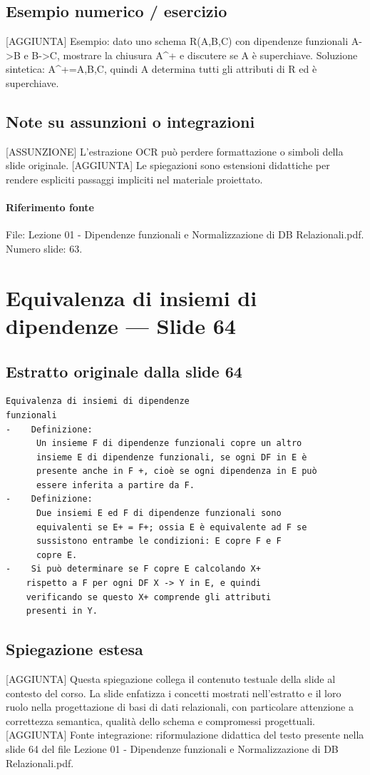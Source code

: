 \documentclass[11pt]{article}
\begin{document}
\subsection*{Esempio numerico / esercizio}
[AGGIUNTA] Esempio: dato uno schema R(A,B,C) con dipendenze funzionali A->B e B->C, mostrare la chiusura A^+ e discutere se A è superchiave. Soluzione sintetica: A^+={A,B,C}, quindi A determina tutti gli attributi di R ed è superchiave.
\subsection*{Note su assunzioni o integrazioni}
[ASSUNZIONE] L'estrazione OCR può perdere formattazione o simboli della slide originale.
[AGGIUNTA] Le spiegazioni sono estensioni didattiche per rendere espliciti passaggi impliciti nel materiale proiettato.
\paragraph{Riferimento fonte} File: Lezione 01 - Dipendenze funzionali e Normalizzazione di DB Relazionali.pdf. Numero slide: 63.
\section{Equivalenza di insiemi di dipendenze --- Slide 64}
\subsection*{Estratto originale dalla slide 64}
\begin{lstlisting}
Equivalenza di insiemi di dipendenze
funzionali
-    Definizione:
      Un insieme F di dipendenze funzionali copre un altro
      insieme E di dipendenze funzionali, se ogni DF in E è
      presente anche in F +, cioè se ogni dipendenza in E può
      essere inferita a partire da F.
-    Definizione:
      Due insiemi E ed F di dipendenze funzionali sono
      equivalenti se E+ = F+; ossia E è equivalente ad F se
      sussistono entrambe le condizioni: E copre F e F
      copre E.
-    Si può determinare se F copre E calcolando X+
    rispetto a F per ogni DF X -> Y in E, e quindi
    verificando se questo X+ comprende gli attributi
    presenti in Y.
\end{lstlisting}
\subsection*{Spiegazione estesa}
[AGGIUNTA] Questa spiegazione collega il contenuto testuale della slide al contesto del corso. La slide enfatizza i concetti mostrati nell'estratto e il loro ruolo nella progettazione di basi di dati relazionali, con particolare attenzione a correttezza semantica, qualità dello schema e compromessi progettuali.
[AGGIUNTA] Fonte integrazione: riformulazione didattica del testo presente nella slide 64 del file Lezione 01 - Dipendenze funzionali e Normalizzazione di DB Relazionali.pdf.
\end{document}
